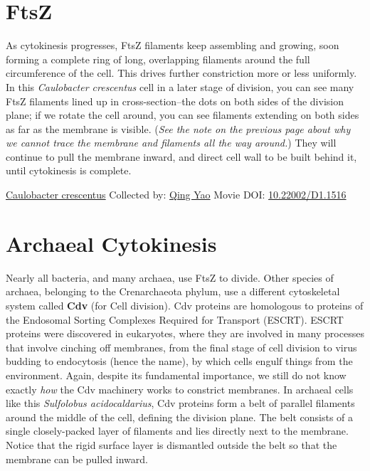 \documentclass[]{tufte-book}
\begin{document}
\hypertarget{ftsz}{%
\section{FtsZ}\label{ftsz}}

As cytokinesis progresses, FtsZ filaments keep assembling and growing, soon forming a complete ring of long, overlapping filaments around the full circumference of the cell. This drives further constriction more or less uniformly. In this \emph{Caulobacter crescentus} cell in a later stage of division, you can see many FtsZ filaments lined up in cross-section--the dots on both sides of the division plane; if we rotate the cell around, you can see filaments extending on both sides as far as the membrane is visible. (\emph{See the note on the previous page about why we cannot trace the membrane and filaments all the way around.}) They will continue to pull the membrane inward, and direct cell wall to be built behind it, until cytokinesis is complete.



\hypertarget{htmlwidget-fe0df5e341a449193561}{}

\label{fig:5-10}\protect\hyperlink{tree}{Caulobacter crescentus} Collected by: \protect\hyperlink{qing_yao}{Qing Yao} Movie DOI: \href{https://doi.org/10.22002/D1.1516}{10.22002/D1.1516}

\hypertarget{archaeal-cytokinesis}{%
\section{Archaeal Cytokinesis}\label{archaeal-cytokinesis}}

Nearly all bacteria, and many archaea, use FtsZ to divide. Other species of archaea, belonging to the Crenarchaeota phylum, use a different cytoskeletal system called \textbf{Cdv} (for Cell division). Cdv proteins are homologous to proteins of the Endosomal Sorting Complexes Required for Transport (ESCRT). ESCRT proteins were discovered in eukaryotes, where they are involved in many processes that involve cinching off membranes, from the final stage of cell division to virus budding to endocytosis (hence the name), by which cells engulf things from the environment. Again, despite its fundamental importance, we still do not know exactly \emph{how} the Cdv machinery works to constrict membranes. In archaeal cells like this \emph{Sulfolobus acidocaldarius}, Cdv proteins form a belt of parallel filaments around the middle of the cell, defining the division plane. The belt consists of a single closely-packed layer of filaments and lies directly next to the membrane. Notice that the rigid surface layer is dismantled outside the belt so that the membrane can be pulled inward.
\end{document}
